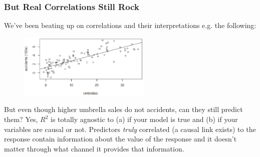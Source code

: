 \documentclass[handout]{beamer}
\begin{document}
\begin{frame}\frametitle{But Real Correlations Still Rock}

We've been beating up on correlations and their interpretations e.g. the following:

\begin{figure}
\centering
\includegraphics[width=2.5in]{umbrellas_car_accidents.png}
\end{figure}
\pause

But even though higher umbrella sales do not  accidents, can they still predict them? \pause Yes, $R^2$ is totally agnostic to (a) if your model is true and \pause (b) if your variables are causal or not. Predictors \textit{truly} correlated (a causal link exists) to the response contain information about the value of the response and it doesn't matter through what channel it provides that information. \pause
	
\end{frame}
\end{document}
